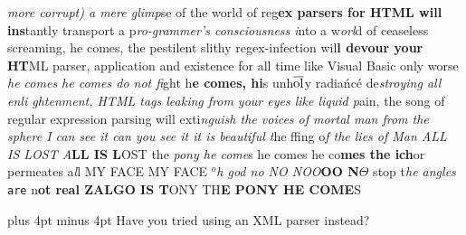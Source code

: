 \raggedright{}{\it more corrupt) a mere glimp}se
of the world of reg{\bf ex parsers for HTML will ins}tantly transport a
p{\it ro-grammer's consciousness i}nto a w{\it orl}d of ceaseless screaming, he
comes\strike{7em}, the pestilent slithy
regex-infection wil{\bf l devour your HT}ML
parser, application and existence for all time like Visual Basic only
worse {\it he comes he comes do not fi}ght
h{\bf e co\rlap{\lower 1pt\hbox{\ \ \thinspace,}}mes, hi}s unh$\overline{\rm ol}$y radia\'nc\'e
de{\it stroying all
enli%
%
%
%
%
ghtenment, HTML tags 
{\bfit leaking from your eyes like
liq}uid p}ain, the song of regular expre\strike{6em}ssion parsing will
exti{\it nguish
the voices of mor{\bfit tal man from the sp}here
I can see it can you see it
it is beautiful t}he
f\thinspace{}\thinspace{}fing o{\it f the 
lie{\bfit s of Man ALL IS LOST A}}{\bf LL IS L}OST
the {\it pony he come}s 
he com\strike{5.1em}es he co{\bf mes {\bfit the} ich}or
permeates a{\it l}l MY
FACE MY FACE $^o${\it h god n{\bfit o NO NOO}}{\bf OO N}$\Theta$ 
stop t{\sl he angles}\graybox{2.5em} {\tt are} n{\bf ot real ZALGO IS T}ONY
TH{\bf E PONY HE COME}S

\parskip 10pt plus 4pt minus 4pt\parindent=0pt%
Have you tried using an XML parser instead?

\bye
